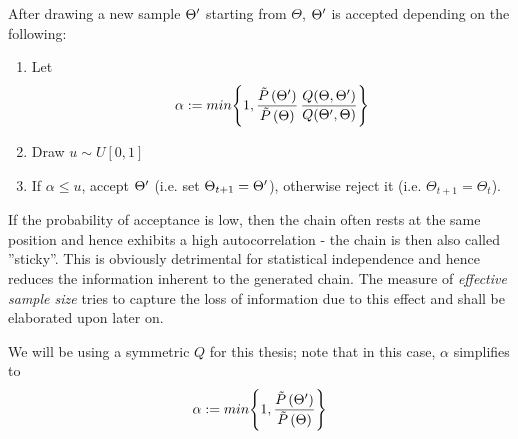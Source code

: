 	After drawing a new sample $\Theta^\prime$ starting from $\Theta$, $\Theta^\prime$ is accepted depending on the following:
	\begin{enumerate}
		\item Let 
		\[
			\alpha := min \Bigg\{ 1,  \frac{\tilde{P}\left(\Theta^\prime\right)}{\tilde{P}\left(\Theta\right)} \, \frac{Q(\Theta, \Theta^\prime)}{Q(\Theta^\prime, \Theta)}			
			\Bigg\}
		\]
		\item Draw $u \sim U[0, 1]$
		\item If $\alpha \leq u$, accept $\Theta^\prime$ (i.e. set $\Theta_{t+1} = \Theta^\prime$), otherwise reject it (i.e. $\Theta_{t+1} = \Theta_t$). 
	\end{enumerate} 
	If the probability of acceptance is low, then the chain often rests at the same position and hence exhibits a high autocorrelation - the chain is then also called ''sticky''. This is obviously detrimental for statistical independence and hence reduces the information inherent to the generated chain. 
	The measure of \textit{effective sample size} tries to capture the loss of information due to this effect and shall be elaborated upon later on.

	We will be using a symmetric $Q$ for this thesis; note that in this case,  $\alpha$ simplifies to 
	\[
			\alpha := min \Bigg\{ 1,  \frac{\tilde{P}\left(\Theta^\prime\right)}{\tilde{P}\left(\Theta\right)}			
		\Bigg\}
	\]
	
	
